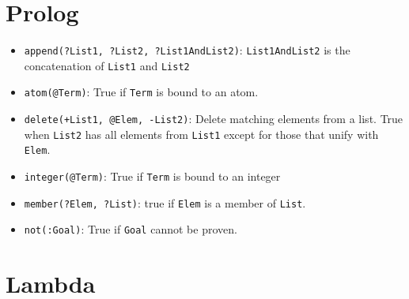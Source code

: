 \documentclass[11pt]{scrartcl}
\begin{document}
\section{Prolog}

\begin{itemize}
    \item \texttt{append(?List1, ?List2, ?List1AndList2)}: \texttt{List1AndList2} is the 
    concatenation of \texttt{List1} and \texttt{List2}
    \item \texttt{atom(@Term)}: True if \texttt{Term} is bound to an atom.
    \item \texttt{delete(+List1, @Elem, -List2)}: Delete matching elements from a list. True 
    when \texttt{List2} has all elements from \texttt{List1} except for those that 
    unify with \texttt{Elem}.
    \item \texttt{integer(@Term)}: True if \texttt{Term} is bound to an integer
    \item \texttt{member(?Elem, ?List)}: true if \texttt{Elem} is a member of \texttt{List}.
    \item \texttt{not(:Goal)}: True if \texttt{Goal} cannot be proven.

\end{itemize}

\section{Lambda}
\end{document}
